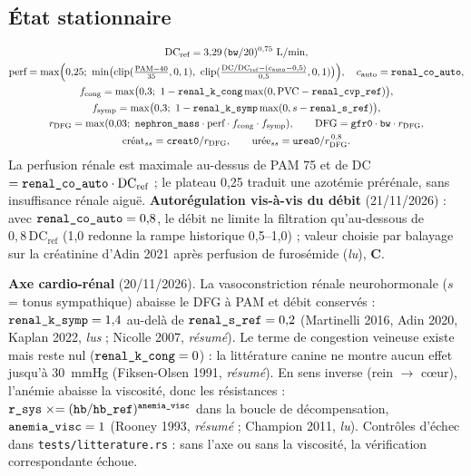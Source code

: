 \documentclass[10pt,a4paper]{article}
\newcommand{\cmd}[1]{\texttt{#1}}
\newcommand{\vp}[1]{\text{\texttt{\detokenize{#1}}}}
\newcommand{\evC}{\textcolor{orange!80!black}{\textbf{C}}}
\newcommand{\acc}[1]{\textsl{#1}}
\begin{document}
\subsection{État stationnaire}
\begin{gather}
\text{DC}_\text{ref} = 3{,}29\,(\vp{bw}/20)^{0{,}75}~\text{L/min},\\
\text{perf} = \max\Bigl(0{,}25;\ \min\bigl(\mathrm{clip}(\tfrac{\text{PAM} - 40}{35}, 0, 1),\ \mathrm{clip}(\tfrac{\text{DC}/\text{DC}_\text{ref} - (c_\text{auto} - 0{,}5)}{0{,}5}, 0, 1)\bigr)\Bigr),\quad c_\text{auto} = \vp{renal_co_auto},\\
f_\text{cong} = \max\bigl(0{,}3;\ 1 - \vp{renal_k_cong}\max(0, \text{PVC} - \vp{renal_cvp_ref})\bigr),\\
f_\text{symp} = \max\bigl(0{,}3;\ 1 - \vp{renal_k_symp}\max(0, s - \vp{renal_s_ref})\bigr),\\
r_\text{DFG} = \max(0{,}03;\ \vp{nephron_mass}\cdot\text{perf}\cdot f_\text{cong}\cdot f_\text{symp}),\qquad \text{DFG} = \vp{gfr0}\cdot\vp{bw}\cdot r_\text{DFG},\\
\text{créat}_{ss} = \vp{creat0}/r_\text{DFG},\qquad \text{urée}_{ss} = \vp{urea0}/r_\text{DFG}^{\,0{,}8}.
\end{gather}
La perfusion rénale est maximale au-dessus de PAM 75 et de DC $= \vp{renal_co_auto}\cdot\text{DC}_\text{ref}$ ; le plateau 0,25 traduit une azotémie prérénale, sans insuffisance rénale aiguë. \textbf{Autorégulation vis-à-vis du débit} (21/11/2026) : avec $\vp{renal_co_auto} = 0{,}8$, le débit ne limite la filtration qu'au-dessous de $0{,}8\,\text{DC}_\text{ref}$ (1,0 redonne la rampe historique 0,5--1,0) ; valeur choisie par balayage sur la créatinine d'Adin 2021 après perfusion de furosémide (\acc{lu}), \evC{}.

\textbf{Axe cardio-rénal} (20/11/2026). La vasoconstriction rénale neurohormonale ($s$ = tonus sympathique) abaisse le DFG à PAM et débit conservés : $\vp{renal_k_symp} = 1{,}4$ au-delà de $\vp{renal_s_ref} = 0{,}2$ (Martinelli 2016, Adin 2020, Kaplan 2022, \acc{lus} ; Nicolle 2007, \acc{résumé}). Le terme de congestion veineuse existe mais reste nul ($\vp{renal_k_cong} = 0$) : la littérature canine ne montre aucun effet jusqu'à 30~mmHg (Fiksen-Olsen 1991, \acc{résumé}). En sens inverse (rein $\to$ cœur), l'anémie abaisse la viscosité, donc les résistances : $\vp{r_sys} \mathrel{\times}= (\vp{hb}/\vp{hb_ref})^{\vp{anemia_visc}}$ dans la boucle de décompensation, $\vp{anemia_visc} = 1$ (Rooney 1993, \acc{résumé} ; Champion 2011, \acc{lu}). Contrôles d'échec dans \cmd{tests/litterature.rs} : sans l'axe ou sans la viscosité, la vérification correspondante échoue.
\end{document}
